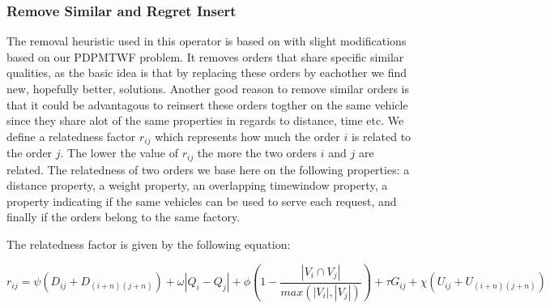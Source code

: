 \documentclass[../main.tex]{subfiles}
\begin{document}
\subsubsection{Remove Similar and Regret Insert}
\label{ssec:shaw}
The removal heuristic used in this operator is based on \citet{shaw97} with slight modifications based on our PDPMTWF problem. 
It removes orders that share specific similar qualities, as the basic idea is that by replacing these orders by eachother we find new, hopefully better, solutions. 
Another good reason to remove similar orders is that it could be advantagous to reinsert these orders togther on the same vehicle since they share alot of the same properties in regards to distance, time etc.
We define a relatedness factor $r_{ij}$ which represents how much the order $i$ is related to the order $j$. 
The lower the value of $r_{ij}$ the more the two orders $i$ and $j$ are related.
The relatedness of two orders we base here on the following properties: 
a distance property, a weight property, an overlapping timewindow property, a property indicating if the same vehicles can be used to serve each request, and finally if the orders belong to the same factory.

The relatedness factor is given by the following equation:

\begin{equation}
\label{relatedness}
    r_{ij} = \psi ( D_{i j} + D_{(i+n)(j+n)}) + \omega|Q_i - Q_j|
    + \phi (1-\dfrac{|V_i\cap V_j|}{max(|V_i|, |V_j|)} ) + \tau G_{ij} + \chi (U_{ij} + U_{(i+n)(j+n)})
\end{equation}
\end{document}
